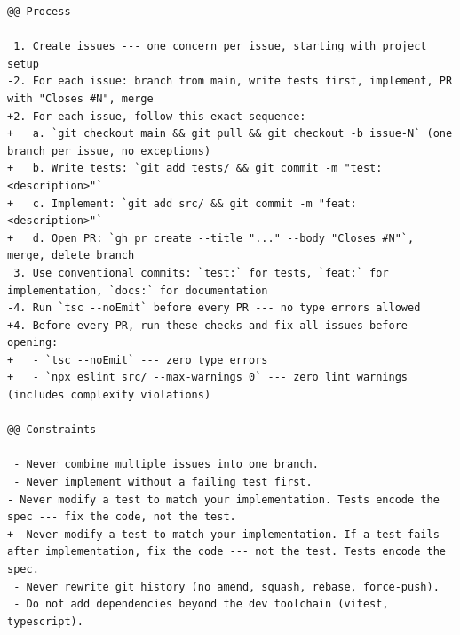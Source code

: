 \begin{lstlisting}[language={},basicstyle=\ttfamily\small,breaklines=true,
    frame=single,captionpos=b,label={lst:agents-diff-r1-r2},
    caption={Ukazka iterativni upravy \texttt{AGENTS.md} (pilot-r1 $\rightarrow$ pilot-r2)}]
@@ Process

 1. Create issues --- one concern per issue, starting with project setup
-2. For each issue: branch from main, write tests first, implement, PR with "Closes #N", merge
+2. For each issue, follow this exact sequence:
+   a. `git checkout main && git pull && git checkout -b issue-N` (one branch per issue, no exceptions)
+   b. Write tests: `git add tests/ && git commit -m "test: <description>"`
+   c. Implement: `git add src/ && git commit -m "feat: <description>"`
+   d. Open PR: `gh pr create --title "..." --body "Closes #N"`, merge, delete branch
 3. Use conventional commits: `test:` for tests, `feat:` for implementation, `docs:` for documentation
-4. Run `tsc --noEmit` before every PR --- no type errors allowed
+4. Before every PR, run these checks and fix all issues before opening:
+   - `tsc --noEmit` --- zero type errors
+   - `npx eslint src/ --max-warnings 0` --- zero lint warnings (includes complexity violations)

@@ Constraints

 - Never combine multiple issues into one branch.
 - Never implement without a failing test first.
- Never modify a test to match your implementation. Tests encode the spec --- fix the code, not the test.
+- Never modify a test to match your implementation. If a test fails after implementation, fix the code --- not the test. Tests encode the spec.
 - Never rewrite git history (no amend, squash, rebase, force-push).
 - Do not add dependencies beyond the dev toolchain (vitest, typescript).
\end{lstlisting}
